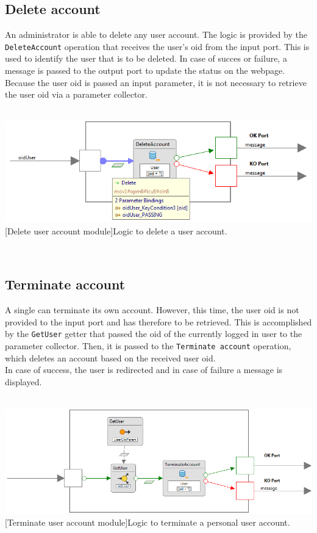\documentclass[11pt, a4paper,svglistings,oneside]{book}
\begin{document}
\subsection{Delete account}

An administrator is able to delete any user account. The logic is provided by the \texttt{DeleteAccount} operation that receives the user's oid from the input port. This is used to identify the user that is to be deleted. In case of succes or failure, a message is passed to the output port to update the status on the webpage. \\
Because the user oid is passed an input parameter, it is not necessary to retrieve the user oid via a parameter collector.
$\;$ \\ \\
\noindent\begin{minipage}{\textwidth}
    \centering
   \includegraphics[width=1.1\textwidth]{Module_DeleteUser.png}
 [Delete user account module]{Logic to delete a user account.}
\end{minipage}
$\;$ \\ 

\subsection{Terminate account}

A single can terminate its own account. However, this time, the user oid is not provided to the input port and has therefore to be retrieved. This is accomplished by the \texttt{GetUser} getter that passed the oid of the currently logged in user to the parameter collector. Then, it is passed to the \texttt{Terminate account} operation, which deletes an account based on the received user oid. \\
In case of success, the user is redirected and in case of failure a message is displayed.
$\;$ \\ \\
\noindent\begin{minipage}{\textwidth}
    \centering
   \includegraphics[width=1.1\textwidth]{Module_Terminate.png}
 [Terminate user account module]{Logic to terminate a personal user account.}
\end{minipage}
$\;$ \\ 
\end{document}
